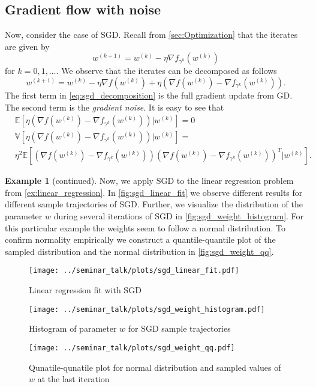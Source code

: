 \documentclass[12pt]{article}
\theoremstyle{definition}
\newtheorem{example}[theorem]{Example}
\numberwithin{equation}{section}
\newcommand{\ev}[1]{\mathbb{E}\left[{#1}\right]}
\newcommand{\var}[1]{\mathbb{V}\left[{#1}\right]}
\begin{document}
\subsection{Gradient flow with noise}
Now, consider the case of SGD. Recall from \autoref{sec:Optimization} that the iterates are given by
\begin{equation}
  w^{(k+1)} = w^{(k)} - \eta \nabla f_{\gamma^k}(w^{(k)})
\end{equation}
for $k = 0,1,\dots$. We observe that the iterates can be decomposed as follows
\begin{equation}
  \label{eq:sgd_decomposition}
  w^{(k+1)} = w^{(k)} - \eta \nabla f(w^{(k)}) + \eta (\nabla f(w^{(k)}) - \nabla f_{\gamma^k}(w^{(k)})).
\end{equation}
The first term in \autoref{eq:sgd_decomposition} is the full gradient update from GD. The second term is the \emph{gradient noise}. It is easy to see that 
\begin{align}
  &\ev{\eta (\nabla f(w^{(k)}) - \nabla f_{\gamma^k}(w^{(k)}))|w^{(k)}} = 0 \\
  &\var{\eta (\nabla f(w^{(k)}) - \nabla f_{\gamma^k}(w^{(k)}))|w^{(k)}} = \\
  & \eta^2 \ev{(\nabla f(w^{(k)}) - \nabla f_{\gamma^k}(w^{(k)}))(\nabla f(w^{(k)}) - \nabla f_{\gamma^k}(w^{(k)}))^T|w^{(k)}}.
\end{align}
\begin{example}[continued]
  Now, we apply SGD to the linear regression problem from \autoref{ex:linear_regression}. In \autoref{fig:sgd_linear_fit} we observe different results for different sample trajectories of SGD.
  Further, we visualize the distribution of the parameter $w$ during several iterations of SGD in \autoref{fig:sgd_weight_histogram}. For this particular example the weights seem to follow a normal distribution. To confirm normality empirically we construct a quantile-quantile plot of the sampled distribution and the normal distribution in \autoref{fig:sgd_weight_qq}.
  \begin{figure}[htb]
    \centering
    \texttt{[image: ../seminar\_talk/plots/sgd\_linear\_fit.pdf]}
    \caption{Linear regression fit with SGD}
    \label{fig:sgd_linear_fit}
  \end{figure}
  \begin{figure}[htb]
    \centering
    \texttt{[image: ../seminar\_talk/plots/sgd\_weight\_histogram.pdf]}
    \caption{Histogram of parameter $w$ for SGD sample trajectories}
    \label{fig:sgd_weight_histogram}
  \end{figure}
  \begin{figure}[htb]
    \centering
    \texttt{[image: ../seminar\_talk/plots/sgd\_weight\_qq.pdf]}
    \caption{Qunatile-qunatile plot for normal distribution and sampled values of $w$ at the last iteration}
    \label{fig:sgd_weight_qq}
  \end{figure}
\end{example}
\end{document}
